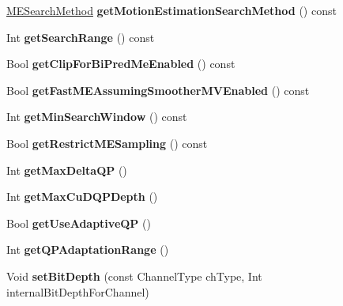 \begin{DoxyCompactItemize}
\item 
\mbox{\label{class_t_enc_cfg_acff49579f87541b518d5402b4c36409e}} 
\hyperlink{_type_def_8h_a8aca966885e6dbeca4cabfc3530a9bde}{M\+E\+Search\+Method} {\bfseries get\+Motion\+Estimation\+Search\+Method} () const
\item 
\mbox{\label{class_t_enc_cfg_a35354530b0894ef4b43fd14f49eb04b8}} 
Int {\bfseries get\+Search\+Range} () const
\item 
\mbox{\label{class_t_enc_cfg_a6881b5b23a32945b9fbba2bf8a1dc8cf}} 
Bool {\bfseries get\+Clip\+For\+Bi\+Pred\+Me\+Enabled} () const
\item 
\mbox{\label{class_t_enc_cfg_adea13f1a51c1db32748acbfe2b6dda4a}} 
Bool {\bfseries get\+Fast\+M\+E\+Assuming\+Smoother\+M\+V\+Enabled} () const
\item 
\mbox{\label{class_t_enc_cfg_afc9050e1451068b44d0d5a5f7872bfd2}} 
Int {\bfseries get\+Min\+Search\+Window} () const
\item 
\mbox{\label{class_t_enc_cfg_a26d74ef65c9d4c2e56e420529f037ca4}} 
Bool {\bfseries get\+Restrict\+M\+E\+Sampling} () const
\item 
\mbox{\label{class_t_enc_cfg_a9867033722ac74b9b34fa4f7e9ddf752}} 
Int {\bfseries get\+Max\+Delta\+QP} ()
\item 
\mbox{\label{class_t_enc_cfg_a3f52dfcc249f16f67e49776a0419233e}} 
Int {\bfseries get\+Max\+Cu\+D\+Q\+P\+Depth} ()
\item 
\mbox{\label{class_t_enc_cfg_af5a052b60823e9fbda47d1daac4b718f}} 
Bool {\bfseries get\+Use\+Adaptive\+QP} ()
\item 
\mbox{\label{class_t_enc_cfg_a87351e92cbdc8d024908e69d11237210}} 
Int {\bfseries get\+Q\+P\+Adaptation\+Range} ()
\item 
\mbox{\label{class_t_enc_cfg_a3296076d287d56766191c5644689665b}} 
Void {\bfseries set\+Bit\+Depth} (const Channel\+Type ch\+Type, Int internal\+Bit\+Depth\+For\+Channel)

\end{DoxyCompactItemize}

